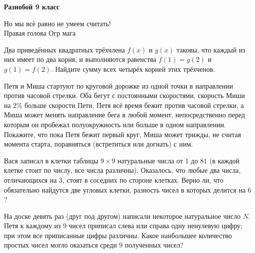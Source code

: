 \centerline{\bf \Huge Разнобой 9 класс}

\begin{flushright}
        \scriptsize{Но мы всё равно не умеем считать!\\ Правая голова Огр мага
}
\end{flushright}
 
Два приведённых квадратных трёхчлена $f(x)$ и $g(x)$ таковы, что каждый из них имеет по два корня, и выполняются равенства $f(1) = g(2)$ и $g(1) = f(2)$. Найдите сумму всех четырёх корней этих трёхченов.

Петя и Миша стартуют по круговой дорожке из одной точки в направлении против часовой стрелки. Оба бегут с постоянными скоростями, скорость Миши на 2\% больше скорости Пети. Петя всё время бежит против часовой стрелки, а Миша может менять направление бега в любой момент, непосредственно перед которым он пробежал полуокружность или больше в одном направлении. Покажите, что пока Петя бежит первый круг, Миша может трижды, не считая момента старта, поравняться (встретиться или догнать) с ним.

Вася записал в клетки таблицы $9 \times 9$ натуральные числа от $1$ до $81$ (в каждой клетке стоит по числу, все числа различны). Оказалось, что любые два числа, отличающихся на $3$, стоят в соседних по стороне клетках. Верно ли, что обязательно найдутся две угловых клетки, разность чисел в которых делится на $6$?

На доске девять раз (друг под другом) написали некоторое натуральное число $N$. Петя к каждому из $9$ чисел приписал слева или справа одну ненулевую цифру; при этом все приписанные цифры различны. Какое наибольшее количество простых чисел могло оказаться среди $9$ полученных чисел?

